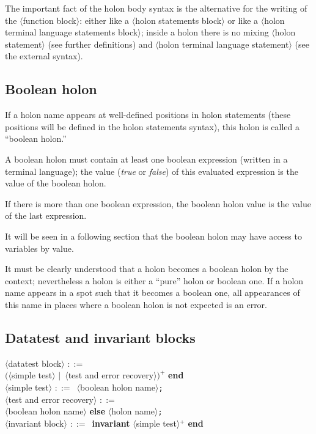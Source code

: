 \documentclass[openany,nobib]{tufte-book}
\newcommand{\kw}[1]{{\bf #1}}
\newcommand{\sym}[1]{$\langle$#1$\rangle$}
\def\is{$::=$\ }
\def\alt{$|$\ }
\begin{document}
The important fact of the holon body syntax is the alternative for the writing
of the \sym{function block}: either like a \sym{holon statements block} or like
a \sym{holon terminal language statements block}; inside a holon there is no
mixing \sym{holon statement} (see further definitions) and \sym{holon terminal
language statement} (see the external syntax).

\subsection{Boolean holon}
\label{sec:boolean-holon}

If a holon name appears at well-defined positions in holon statements (these
positions will be defined in the holon statements syntax), this holon is called
a ``boolean holon.''

A boolean holon must contain at least one boolean expression (written in a
terminal language); the value ({\sl true} or {\sl false}) of this evaluated
expression is the value of the boolean holon.

If there is more than one boolean expression, the boolean holon value is the
value of the last expression.

It will be seen in a following section that the boolean holon may have access
to variables by value.

It must be clearly understood that a holon becomes a boolean holon by the
context; nevertheless a holon is either a ``pure'' holon or boolean one. If a
holon name appears in a spot such that it becomes a boolean one, all
appearances of this name in places where a boolean holon is not expected is an
error.

\subsection{Datatest and invariant blocks}

\begin{tcolorbox}
\sym{datatest block} \is \\
\qquad\kw{datatest} $($\sym{simple test} \alt \sym{test and error
recovery}$)^+$ \kw{end}\\
\sym{simple test} \is \sym{boolean holon name}{\tt;}\\
\sym{test and error recovery} \is \\
\qquad\sym{boolean holon name} \kw{else} \sym{holon name}{\tt;}\\
\sym{invariant block} \is \kw{invariant} \sym{simple test}$^+$ \kw{end}
\end{tcolorbox}
\end{document}
